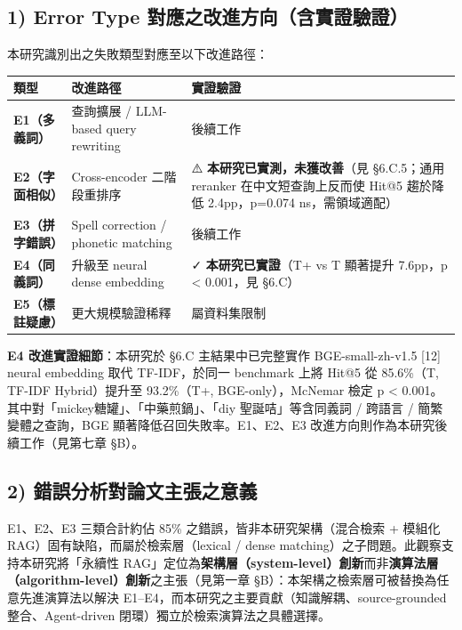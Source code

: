 \subsection{1) Error Type 對應之改進方向（含實證驗證）}\label{ux6539ux9032ux65b9ux5411}

本研究識別出之失敗類型對應至以下改進路徑：

\begin{longtable}[]{@{}p{}p{}p{}@{}}
\toprule\noalign{}
類型 & 改進路徑 & 實證驗證 \\
\midrule\noalign{}
\endhead
\bottomrule\noalign{}
\endlastfoot
\textbf{E1（多義詞）} & 查詢擴展 / LLM-based query rewriting & 後續工作 \\
\textbf{E2（字面相似）} & Cross-encoder 二階段重排序 & ⚠️ \textbf{本研究已實測，未獲改善}（見 §6.C.5；通用 reranker 在中文短查詢上反而使 Hit@5 趨於降低 2.4pp，p=0.074 ns，需領域適配） \\
\textbf{E3（拼字錯誤）} & Spell correction / phonetic matching & 後續工作 \\
\textbf{E4（同義詞）} & 升級至 neural dense embedding & ✓ \textbf{本研究已實證}（T+ vs T 顯著提升 7.6pp，p < 0.001，見 §6.C） \\
\textbf{E5（標註疑慮）} & 更大規模驗證稀釋 & 屬資料集限制 \\
\end{longtable}

\textbf{E4 改進實證細節}：本研究於 §6.C 主結果中已完整實作 BGE-small-zh-v1.5
{[}12{]} neural embedding 取代 TF-IDF，於同一 benchmark 上將 Hit@5 從
85.6\%（T, TF-IDF Hybrid）提升至 93.2\%（T+, BGE-only），McNemar 檢定 p
< 0.001。其中對「mickey糖罐」、「中藥煎鍋」、「diy 聖誕咭」等含同義詞 / 跨語言 / 簡繁變體之查詢，BGE 顯著降低召回失敗率。E1、E2、E3 改進方向則作為本研究後續工作（見第七章
§B）。

\subsection{2) 錯誤分析對論文主張之意義}\label{ux932fux8aa4ux5206ux6790ux5c0dux8ad6ux6587ux4e3bux5f35ux4e4bux610fux7fa9}

E1、E2、E3 三類合計約佔 85\%
之錯誤，皆非本研究架構（混合檢索 + 模組化 RAG）固有缺陷，而屬於檢索層（lexical
/ dense matching）之子問題。此觀察支持本研究將「永續性 RAG」定位為\textbf{架構層（system-level）創新}而非\textbf{演算法層（algorithm-level）創新}之主張（見第一章
§B）：本架構之檢索層可被替換為任意先進演算法以解決
E1--E4，而本研究之主要貢獻（知識解耦、source-grounded 整合、Agent-driven
閉環）獨立於檢索演算法之具體選擇。


